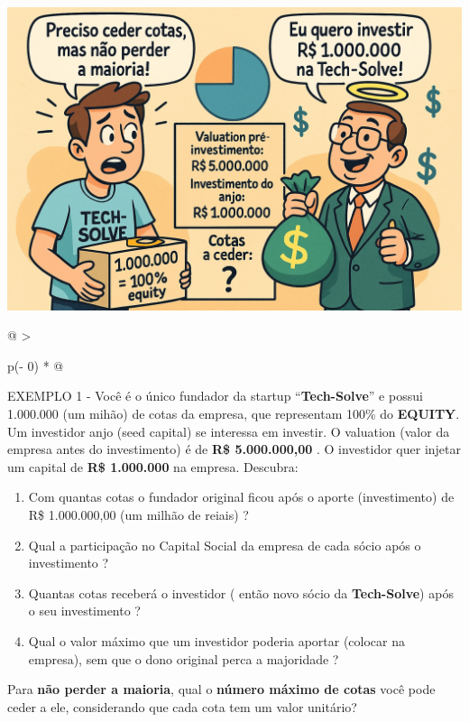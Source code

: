 \documentclass[
]{book}
\begin{document}
\includegraphics[width=7.125in,height=\textheight]{images/03-2025-08-19_20/exercicio-01.jpg}

\begin{longtable}[]{@{}
  >{\raggedright\arraybackslash}p{(\columnwidth - 0\tabcolsep) * }@{}}
\toprule\noalign{}
\endhead
\bottomrule\noalign{}
\endlastfoot
\begin{minipage}[t]{\linewidth}\raggedright
EXEMPLO 1 - Você é o único fundador da startup ``\textbf{Tech-Solve}'' e possui 1.000.000 (um mihão) de cotas da empresa, que representam 100\% do \textbf{EQUITY}. Um investidor anjo (seed capital) se interessa em investir. O valuation (valor da empresa antes do investimento) é de \textbf{R\$ 5.000.000,00} . O investidor quer injetar um capital de \textbf{R\$ 1.000.000} na empresa. Descubra:

\begin{enumerate}
\def\labelenumi{\Roman{enumi})}
\item
  Com quantas cotas o fundador original ficou após o aporte (investimento) de R\$ 1.000.000,00 (um milhão de reiais) ?
\item
  Qual a participação no Capital Social da empresa de cada sócio após o investimento ?
\item
  Quantas cotas receberá o investidor ( então novo sócio da \textbf{Tech-Solve}) após o seu investimento ?
\item
  Qual o valor máximo que um investidor poderia aportar (colocar na empresa), sem que o dono original perca a majoridade ?
\end{enumerate}

Para \textbf{não perder a maioria}, qual o \textbf{número máximo de cotas} você pode ceder a ele, considerando que cada cota tem um valor unitário?
\end{minipage} \\
\end{longtable}
\end{document}
